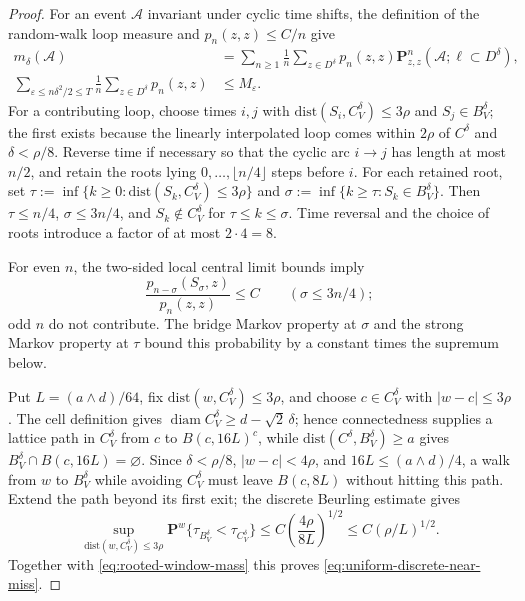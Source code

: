 \documentclass[11pt]{article}
\numberwithin{equation}{section}
\newcommand{\1}{\mathbf{1}}
\newcommand{\dist}{\mathrm{dist}}
\newcommand{\diam}{\operatorname{diam}}
\begin{document}
\begin{proof}
For an event \(\mathcal A\) invariant under cyclic time shifts, the definition of the random-walk loop measure and \(p_n(z,z)\leq C/n\) give
\begin{align}
 m_\delta(\mathcal A)
 &=\sum_{n\geq1}\frac1n\sum_{z\in D^\delta}
 p_n(z,z)\mathbf P_{z,z}^n(\mathcal A;\ell\subset D^\delta),
 \label{eq:rooted-loop-representation}\\
 \sum_{\varepsilon\leq n\delta^2/2\leq T}\frac1n
 \sum_{z\in D^\delta}p_n(z,z)&\leq M_\varepsilon .
 \label{eq:rooted-window-mass}
\end{align}
For a contributing loop, choose times \(i,j\) with
\(\dist(S_i,C_V^\delta)\leq3\rho\) and \(S_j\in B_V^\delta\); the
first exists because the linearly interpolated loop comes within \(2\rho\)
of \(C^\delta\) and \(\delta<\rho/8\).  Reverse time if necessary so
that the cyclic arc \(i\to j\) has length at most \(n/2\), and retain
the roots lying \(0,\ldots,\lfloor n/4\rfloor\) steps before \(i\).  For
each retained root, set
\(\tau:=\inf\{k\geq0:\dist(S_k,C_V^\delta)\leq3\rho\}\) and
\(\sigma:=\inf\{k\geq\tau:S_k\in B_V^\delta\}\).  Then
\(\tau\leq n/4\), \(\sigma\leq3n/4\), and
\(S_k\notin C_V^\delta\) for \(\tau\leq k\leq\sigma\).  Time reversal and
the choice of roots introduce a factor of at most \(2\cdot4=8\).

For even \(n\), the two-sided local central limit bounds imply
\[
 \frac{p_{n-\sigma}(S_\sigma,z)}{p_n(z,z)}\leq C
 \qquad(\sigma\leq3n/4);
\]
odd \(n\) do not contribute.  The bridge Markov property at \(\sigma\) and the strong Markov property at \(\tau\) bound this probability by a constant times the supremum below.

Put \(L=(a\wedge d)/64\), fix
\(\dist(w,C_V^\delta)\leq3\rho\), and choose \(c\in C_V^\delta\) with
\(|w-c|\leq3\rho\).  The cell definition gives
\(\diam C_V^\delta\geq d-\sqrt2\,\delta\); hence connectedness supplies
a lattice path in \(C_V^\delta\) from \(c\) to \(B(c,16L)^c\), while
\(\dist(C^\delta,B_V^\delta)\geq a\) gives
\(B_V^\delta\cap B(c,16L)=\varnothing\).  Since
\(\delta<\rho/8\), \(|w-c|<4\rho\), and
\(16L\leq(a\wedge d)/4\), a walk from \(w\) to \(B_V^\delta\) while
avoiding \(C_V^\delta\) must leave \(B(c,8L)\) without hitting this path.  Extend the path
beyond its first exit; the discrete Beurling estimate
\cite[Theorem~6.8.1]{LawlerLimic2010} gives
\[
 \sup_{\dist(w,C_V^\delta)\leq3\rho}
 \mathbf P^w\{\tau_{B_V^\delta}<\tau_{C_V^\delta}\}
 \leq C\left(\frac{4\rho}{8L}\right)^{1/2}
 \leq C(\rho/L)^{1/2}.
\]
Together with \eqref{eq:rooted-window-mass} this proves
\eqref{eq:uniform-discrete-near-miss}.


\end{proof}
\end{document}
